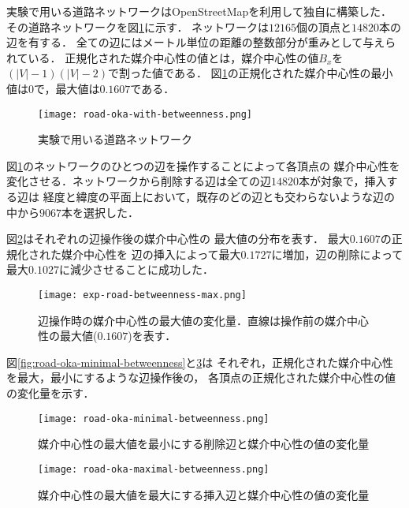 実験で用いる道路ネットワークはOpenStreetMap\cite{OpenStreetMap}を利用して独自に構築した．
その道路ネットワークを図\ref{fig:road-okayama}に示す．
ネットワークは$12165$個の頂点と$14820$本の辺を有する．
全ての辺にはメートル単位の距離の整数部分が重みとして与えられている．
正規化された媒介中心性の値とは，媒介中心性の値$B_x$を$(|V|-1)(|V|-2)$で割った値である．
図\ref{fig:road-okayama}の正規化された媒介中心性の最小値は$0$で，最大値は$0.1607$である．

\begin{figure}[tb]
  \centering
  \texttt{[image: road-oka-with-betweenness.png]}
  \caption{実験で用いる道路ネットワーク}
  \label{fig:road-okayama}
\end{figure}

図\ref{fig:road-okayama}のネットワークのひとつの辺を操作することによって各頂点の
媒介中心性を変化させる．ネットワークから削除する辺は全ての辺$14820$本が対象で，挿入する辺は
経度と緯度の平面上において，既存のどの辺とも交わらないような辺の中から$9067$本を選択した．

図\ref{fig:exp-road-betweenness-max}はそれぞれの辺操作後の媒介中心性の
最大値の分布を表す．
最大$0.1607$の正規化された媒介中心性を
辺の挿入によって最大$0.1727$に増加，辺の削除によって最大$0.1027$に減少させることに成功した．

\begin{figure}[tb]
  \centering
  \texttt{[image: exp-road-betweenness-max.png]}
  \caption{辺操作時の媒介中心性の最大値の変化量．直線は操作前の媒介中心性の最大値($0.1607$)を表す．}
  \label{fig:exp-road-betweenness-max}
\end{figure}

図\ref{fig:road-oka-minimal-betweenness}と\ref{fig:road-oka-maximal-betweenness}は
それぞれ，正規化された媒介中心性を最大，最小にするような辺操作後の，
各頂点の正規化された媒介中心性の値の変化量を示す．

\begin{figure}[tb]
   \begin{minipage}{0.48\textwidth}
     \centering
     \texttt{[image: road-oka-minimal-betweenness.png]}
     \caption{媒介中心性の最大値を最小にする削除辺と媒介中心性の値の変化量}
     \label{fig:road-oka-minimal-betweenness}
   \end{minipage}\hfill
   \begin{minipage}{0.48\textwidth}
     \centering
     \texttt{[image: road-oka-maximal-betweenness.png]}
     \caption{媒介中心性の最大値を最大にする挿入辺と媒介中心性の値の変化量}
     \label{fig:road-oka-maximal-betweenness}
   \end{minipage}
\end{figure}

